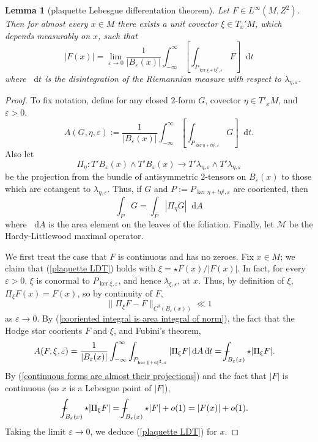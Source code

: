 \documentclass[reqno,11pt]{amsart}
\newcommand*\dif{\mathop{}\!\mathrm{d}}
\newtheorem{lemma}[theorem]{Lemma}
\theoremstyle{definition}
\numberwithin{equation}{section}
\def\Xint#1{\mathchoice
{\XXint\displaystyle\textstyle{#1}}%
{\XXint\textstyle\scriptstyle{#1}}%
{\XXint\scriptstyle\scriptscriptstyle{#1}}%
{\XXint\scriptscriptstyle\scriptscriptstyle{#1}}%
\!\int}
\def\XXint#1#2#3{{\setbox0=\hbox{$#1{#2#3}{\int}$ }
\vcenter{\hbox{$#2#3$ }}\kern-.6\wd0}}
\def\dashint{\Xint-}
\begin{document}
\begin{lemma}[plaquette Lebesgue differentation theorem]
Let $F \in L^\infty(M, Z^2)$.
Then for almost every $x \in M$ there exists a unit covector $\xi \in T_x' M$, which depends measurably on $x$, such that
\begin{equation}\label{plaquette LDT}
|F(x)| = \lim_{\varepsilon \to 0} \frac{1}{|B_\varepsilon(x)|} \int_{-\infty}^\infty \left[\int_{P_{\ker \xi + t\xi^\sharp, \varepsilon}} F\right] \dif t
\end{equation}
where $\dif t$ is the disintegration of the Riemannian measure with respect to $\lambda_{\eta, \varepsilon}$.
\end{lemma}
\begin{proof}
To fix notation, define for any closed $2$-form $G$, covector $\eta \in T'_x M$, and $\varepsilon > 0$,
$$A(G, \eta, \varepsilon) := \frac{1}{|B_\varepsilon(x)|} \int_{-\infty}^\infty \left[\int_{P_{\ker \eta + t\eta^\sharp, \varepsilon}} G\right] \dif t.$$
Also let 
$$\Pi_\eta: T' B_\varepsilon(x) \wedge T' B_\varepsilon(x) \to T' \lambda_{\eta, \varepsilon} \wedge T' \lambda_{\eta, \varepsilon}$$
be the projection from the bundle of antisymmetric $2$-tensors on $B_\varepsilon(x)$ to those which are cotangent to $\lambda_{\eta, \varepsilon}$.
Thus, if $G$ and $P := P_{\ker \eta + t\eta^\sharp, \varepsilon}$ are cooriented, then
\begin{equation}\label{cooriented integral is area integral of norm}
	\int_P G = \int_P |\Pi_\eta G| \dif A
\end{equation}
where $\dif A$ is the area element on the leaves of the foliation.
Finally, let $\mathcal M$ be the Hardy-Littlewood maximal operator.

We first treat the case that $F$ is continuous and has no zeroes.
Fix $x \in M$; we claim that (\ref{plaquette LDT}) holds with $\xi = \star F(x)/|F(x)|$.
In fact, for every $\varepsilon > 0$, $\xi$ is conormal to $P_{\ker \xi, \varepsilon}$, and hence $\lambda_{\xi, \varepsilon}$, at $x$.
Thus, by definition of $\xi$, $\Pi_\xi F(x) = F(x)$, so by continuity of $F$,
\begin{equation}\label{continuous forms are almost their projections}
	\|\Pi_\xi F - F\|_{C^0(B_\varepsilon(x))} \ll 1
\end{equation}
as $\varepsilon \to 0$.
By (\ref{cooriented integral is area integral of norm}), the fact that the Hodge star coorients $F$ and $\xi$, and Fubini's theorem,
\begin{align*}
A(F, \xi, \varepsilon)
&= \frac{1}{|B_\varepsilon(x)|} \int_{-\infty}^\infty \int_{P_{\ker \xi + t\xi^\sharp, \varepsilon}} |\Pi_\xi F| \dif A \dif t
= \dashint_{B_\varepsilon(x)} \star |\Pi_\xi F|.
\end{align*}
By (\ref{continuous forms are almost their projections}) and the fact that $|F|$ is continuous (so $x$ is a Lebesgue point of $|F|$),
\begin{align*}
\dashint_{B_\varepsilon(x)} \star |\Pi_\xi F|
&= \dashint_{B_\varepsilon(x)} \star |F| + o(1) = |F(x)| + o(1).
\end{align*}
Taking the limit $\varepsilon \to 0$, we deduce (\ref{plaquette LDT}) for $x$.


\end{proof}
\end{document}
